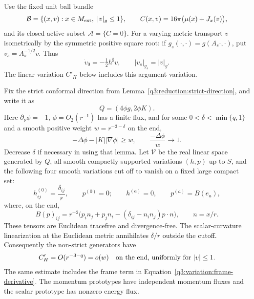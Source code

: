Use the fixed unit ball bundle
\[
 \mathcal B=\{(x,v):x\in M_{\mathrm{ext}},\ |v|_g\le1\},\qquad
 C(x,v)=16\pi\bigl(\mu(x)+J_x(v)\bigr),
\]
and its closed active subset $\mathcal A=\{C=0\}$.
For a varying metric transport $v$ isometrically by the symmetric
positive square root: if $g_s(\cdot,\cdot)=g(A_s\cdot,\cdot)$,
put $v_s=A_s^{-1/2}v$.  Thus
\begin{equation}
 \dot v_0=-\tfrac12 h^\sharp v,
 \qquad |v_s|_{g_s}=|v|_g.
 \label{q3:variation:frame-derivative}
\end{equation}
The linear variation $C'_H$ below includes this argument variation.

Fix the strict conformal direction from
Lemma~\ref{q3:reduction:strict-direction}, and write it as
\[
 Q=(4\phi g,2\phi K).
\]
Here $\partial_\nu\phi=-1$, $\phi=O_2(r^{-1})$ has a finite flux,
and for some $0<\delta<\min\{q,1\}$ and a smooth positive weight
$w=r^{-3-\delta}$ on the end,
\begin{equation}
 -\Delta\phi-|K||\nabla\phi|\ge w,
 \qquad \frac{-\Delta\phi}{w}\longrightarrow1.
 \label{q3:variation:strict-weight}
\end{equation}
Decrease $\delta$ if necessary in using that lemma.
Let $\mathcal V$ be the real linear space generated by $Q$, all smooth
compactly supported variations $(h,p)$ up to $S$, and the following
four smooth variations cut off to vanish on a fixed large compact
set:
\begin{equation}
 h^{(0)}_{ij}=\frac{\delta_{ij}}r,\qquad p^{(0)}=0;
 \qquad h^{(a)}=0,\qquad p^{(a)}=B(e_a),
 \label{q3:variation:prototypes}
\end{equation}
where, on the end,
\begin{equation}
 B(p)_{ij}=r^{-2}
  \bigl(p_i n_j+p_j n_i-(\delta_{ij}-n_in_j)p\cdot n\bigr),
 \qquad n=x/r.
 \label{q3:variation:momentum-prototype}
\end{equation}
These tensors are Euclidean tracefree and divergence-free.
The scalar-curvature linearization at the Euclidean metric annihilates
$\delta/r$ outside the cutoff.  Consequently the non-strict generators
have
\begin{equation}
 C'_H=O(r^{-3-q})=o(w)
 \quad\hbox{on the end, uniformly for }|v|\le1.
 \label{q3:variation:prototype-error}
\end{equation}
The same estimate includes the frame term in
Equation~\eqref{q3:variation:frame-derivative}.  The momentum prototypes
have independent momentum fluxes and the scalar prototype has nonzero
energy flux.

